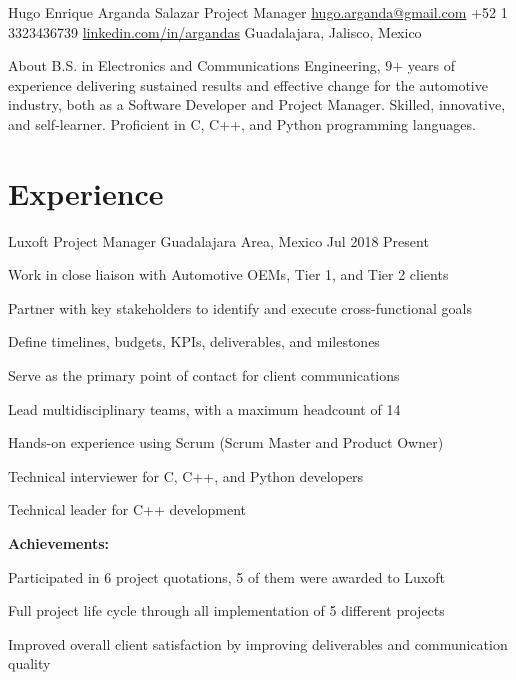 \documentclass[10pt, letterpaper]{article} %
\begin{document}

\customheader
{Hugo Enrique Arganda Salazar}
{Project Manager}
{\href{mailto:hugo.arganda@gmail.com}{hugo.arganda@gmail.com}}
{+52 1 3323436739}
{\href{https://www.linkedin.com/in/argandas}{linkedin.com/in/argandas}}
{Guadalajara, Jalisco, Mexico}





\summary
{About}
{
B.S. in Electronics and Communications Engineering, 9+ years of experience delivering sustained results and effective change for the automotive industry, both as a Software Developer and Project Manager. Skilled, innovative, and self-learner. Proficient in C, C++, and Python programming languages.
}


\section{Experience}

\job
{Luxoft}
{Project Manager}
{Guadalajara Area, Mexico}
{Jul 2018}
{Present}
{
\begin{itemize-bullets}
\item{Work in close liaison with Automotive OEMs, Tier 1, and Tier 2 clients}
\item{Partner with key stakeholders to identify and execute cross-functional goals}
\item{Define timelines, budgets, KPIs, deliverables, and milestones}
\item{Serve as the primary point of contact for client communications}
\item{Lead multidisciplinary teams, with a maximum headcount of 14}
\item{Hands-on experience using Scrum (Scrum Master and Product Owner)}
\item{Technical interviewer for C, C++, and Python developers}
\item{Technical leader for C++ development}
\end{itemize-bullets}
\textbf{Achievements:}
\begin{itemize-bullets}
\item{Participated in 6 project quotations, 5 of them were awarded to Luxoft}
\item{Full project life cycle through all implementation of 5 different projects}
\item{Improved overall client satisfaction by improving deliverables and communication quality}
\end{itemize-bullets}
}
\end{document}
